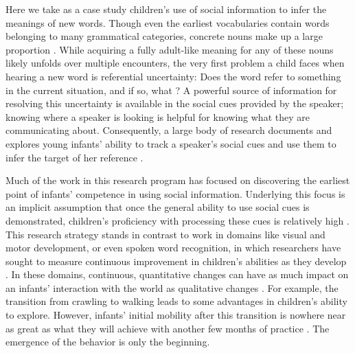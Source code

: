 \documentclass{pnastwo}
\begin{document}
\begin{article}



Here we take as a case study children's use of social information to infer the meanings of new words. Though even the earliest vocabularies contain words belonging to many grammatical categories, concrete nouns make up a large proportion \citep{bates1994}. While acquiring a fully adult-like meaning for any of these nouns likely unfolds over multiple encounters, the very first problem a child faces when hearing a new word is referential uncertainty: Does the word refer to something in the current situation, and if so, what \citep{carey1978, yu2007, frank2009}? A powerful source of information for resolving this uncertainty is available in the social cues provided by the speaker; knowing where a speaker is looking is helpful for knowing what they are communicating about. Consequently, a large body of research documents and explores young infants' ability to track a speaker's social cues and use them to infer the target of her reference \citep[e.g.,][]{scaife1975, baldwin1993, hollich2000, senju2008}.

Much of the work in this research program has focused on discovering the earliest point of infants' competence in using social information. Underlying this focus is an implicit assumption that once the general ability to use social cues is demonstrated, children's proficiency with processing these cues is relatively high \citep[e.g.][]{corkum1998, brooks2005, csibra2009}. This research strategy stands in contrast to work in domains like visual and motor development, or even spoken word recognition, in which researchers have sought to measure continuous improvement in children's abilities as they develop \citep{sokol1978, banks1980, forssberg1991, thelen1995,fernald1998}. In these domains, continuous, quantitative changes can have as much impact on an infants' interaction with the world as qualitative changes \cite{adolph2015}. For example, the transition from crawling to walking leads to some advantages in children's ability to explore. However, infants' initial mobility after this transition is nowhere near as great as what they will achieve with another few months of practice \cite{adolph2012}. The emergence of the behavior is only the beginning.


\end{article}
\end{document}
